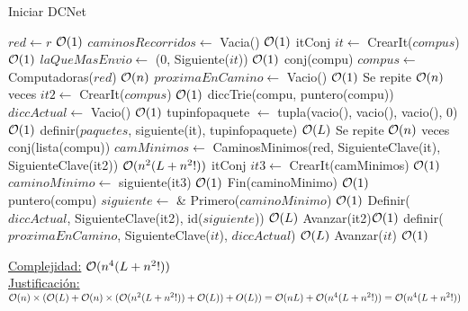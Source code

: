 \begin{Algoritmos}


\begin{algorithm}
\caption{Iniciar DCNet}
\begin{algorithmic}[1]
  \State $red \gets r$ \Comment $\mathcal{O}(1)$
  \State $caminosRecorridos \gets$ Vacia() \Comment $\mathcal{O}(1)$ 
  \State itConj $it \gets$ CrearIt($compus$) \Comment $\mathcal{O}(1)$
  \State $laQueMasEnvio \gets$ (0, Siguiente($it$)) \Comment $\mathcal{O}(1)$
  \State conj(compu) $compus \gets$ Computadoras($red$) \Comment $\mathcal{O}(n)$
  \State $proximaEnCamino \gets$ Vacio() \Comment $\mathcal{O}(1)$
   \Comment Se repite $\mathcal{O}(n)$ veces
    \State {} $it2 \gets$ CrearIt($compus$) \Comment $\mathcal{O}(1)$
    \State diccTrie(compu, puntero(compu)) $diccActual \gets$ Vacio() \Comment $\mathcal{O}(1)$
	\State {} tupinfopaquete $\gets$ tupla(vacio(), vacio(), vacio(), 0) \Comment $\mathcal{O}(1)$	
	\State definir($paquetes$, siguiente(it), tupinfopaquete) \Comment $\mathcal{O}(L)$
     \Comment Se repite $\mathcal{O}(n)$ veces
      \State conj(lista(compu)) $camMinimos \gets$ CaminosMinimos(red, SiguienteClave(it), SiguienteClave(it2)) \Comment $\mathcal{O}(n^2(L + n^2!))$
      \State itConj $it3 \gets$ CrearIt(camMinimos) \Comment $\mathcal{O}(1)$
      \State $caminoMinimo \gets$ siguiente(it3) \Comment $\mathcal{O}(1)$
      \State Fin(caminoMinimo) \Comment $\mathcal{O}(1)$
      \State puntero(compu) $siguiente \gets$ \& Primero($caminoMinimo$) \Comment $\mathcal{O}(1)$
      \State Definir($diccActual$, SiguienteClave(it2), id($siguiente$)) \Comment $\mathcal{O}(L)$
      \State Avanzar(it2)\Comment $\mathcal{O}(1)$
    \EndWhile
    \State definir($proximaEnCamino$, SiguienteClave($it$), $diccActual$) \Comment $\mathcal{O}(L)$
    \State Avanzar($it$) \Comment $\mathcal{O}(1)$
  \EndWhile
   
  \EndProcedure 
\end{algorithmic}
\underline{Complejidad:} $\mathcal{O}(n^4(L + n^2!))$ \\
 \underline{Justificación:} $\mathcal{O}(n)\times(\mathcal{O}(L) + \mathcal{O}(n)\times(\mathcal{O}(n^2 (L+n^2!)) + \mathcal{O}(L)) + O(L)) = \mathcal{O}(nL) + \mathcal{O}(n^4(L + n^2!)) =   \mathcal{O}(n^4(L + n^2!))$
\end{algorithm}



\end{Algoritmos}
